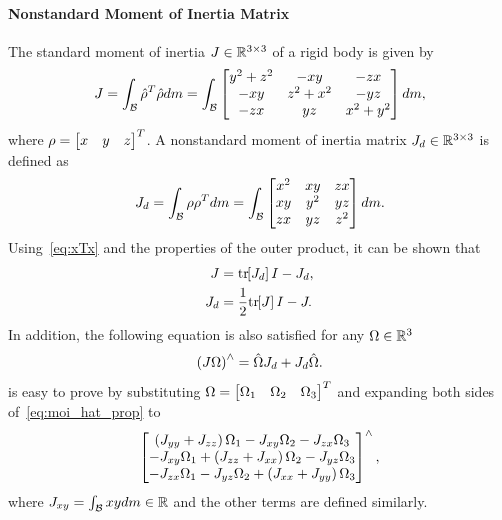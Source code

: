 \paragraph{Nonstandard Moment of Inertia Matrix}\label{sec:nonstandard_moi}
The standard moment of inertia \( J \in \mathbb{R}^{3 \times 3} \) of a rigid body is given by
\begin{align}\label{eq:standard_moment_of_inertia}
    J = \int_{\mathcal{B}} \hat{\rho}^T \hat{\rho} dm 
    = \int_{\mathcal{B}}  
    \begin{bmatrix} 
        y^2 + z^2 & -xy & -zx \\
        -xy & z^2 + x^2 & -yz \\
        -zx & yz & x^2 + y^2
    \end{bmatrix} dm, 
\end{align}
where \( \rho = \begin{bmatrix} x & y & z \end{bmatrix}^T\).
A nonstandard moment of inertia matrix \( J_d \in \mathbb{R}^{3 \times 3 } \) is defined as
\begin{align} \label{eq:nonstandard_moment_of_inertia}
    J_d = \int_{\mathcal{B}} \rho \rho^T dm = \int_{\mathcal{B}} 
    \begin{bmatrix}
        x^2 & xy & zx \\
        xy & y^2 & yz \\
        zx & yz & z^2
    \end{bmatrix} dm.
\end{align}
Using~\cref{eq:xTx} and the properties of the outer product, it can be shown that
\begin{subequations}\label{eq:moi_transformation}
    \begin{align}
        J &= \mathrm{tr}\negthickspace\left[ J_d \right] I - J_d, \label{eq:moi_ns2s}\\
        J_d &= \frac{1}{2} \mathrm{tr}\negthickspace\left[ J \right] I - J.\label{eq:moi_s2ns}
    \end{align}
\end{subequations}     
In addition, the following equation is also satisfied for any \( \Omega \in \mathbb{R}^3 \)
\begin{align}\label{eq:moi_hat_prop}
    \left( J \Omega \right)^\wedge = \hat{\Omega} J_d + J_d \hat{\Omega}.
\end{align}
 is easy to prove by substituting \( \Omega = \begin{bmatrix} \Omega_1 & \Omega_2 & \Omega_3 \end{bmatrix}^T \) and expanding both sides of~\cref{eq:moi_hat_prop} to
\begin{align*}
    \begin{bmatrix}
        \left( J_{yy} + J_{zz} \right) \Omega_1 - J_{xy} \Omega_2 - J_{zx} \Omega_3 \\
        -J_{xy}\Omega_1 + \left( J_{zz} + J_{xx} \right) \Omega_2 - J_{yz}\Omega_3 \\
        -J_{zx}\Omega_1 - J_{yz}\Omega_2 + \left( J_{xx} + J_{yy} \right) \Omega_3
    \end{bmatrix}^\wedge,
\end{align*}
where \( J_{xy} = \int_{\mathcal{B}} xy dm \in \mathbb{R} \) and the other terms are defined similarly.

